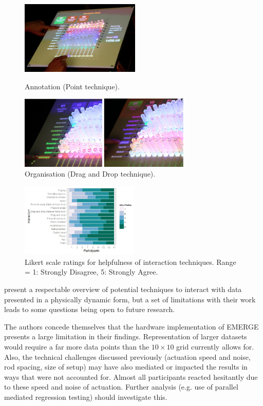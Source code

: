 \documentclass[11pt]{article}
\begin{document}
\begin{figure}[H]
\centering
  \includegraphics[height=3.5cm]{img/taher2015-annotation.png}
  \caption{Annotation (Point technique).}\label{fig:taher2015-annotation}
\endminipage\hfill
{}%
\centering
  \includegraphics[height=3.5cm]{img/taher2015-organize.png}
  \caption{Organisation (Drag and Drop technique).}\label{fig:taher2015-organize}
\endminipage
\end{figure}

\begin{figure}[H]
\centering
\includegraphics[width=0.5\textwidth]{img/taher2015-likert.png} 
\caption{Likert scale ratings for helpfulness of interaction
techniques. Range = 1: Strongly Disagree, 5: Strongly Agree.}\label{fig:taher2015-likert}
\end{figure}

\citet{taher2015} present a respectable overview of potential techniques to interact with data presented in a physically dynamic form, but a set of limitations with their work leads to some questions being open to future research. 

The authors concede themselves that the hardware implementation of EMERGE presents a large limitation in their findings. Representation of larger datasets would require a far more data points than the $10\times10$ grid currently allows for. Also, the technical challenges discussed previously (actuation speed and noise, rod spacing, size of setup) may have also mediated or impacted the results in ways that were not accounted for. Almost all participants reacted hesitantly due to these speed and noise of actuation. Further analysis (e.g. use of parallel mediated regression testing) should investigate this.
\end{document}
